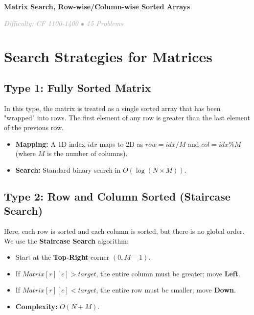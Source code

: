 \documentclass[11pt,a4paper,oneside]{book}
\begin{document}
\begin{tcolorbox}[
    enhanced,
    colback=white,
    colframe=secondaryblue,
    boxrule=1pt,
    arc=2mm,
    left=10pt,
    right=10pt
]
\textbf{\large\textcolor{primaryblue}{Matrix Search, Row-wise/Column-wise Sorted Arrays}}
\end{tcolorbox}

\vspace{0.5cm}

\begin{center}
\textit{\textcolor{darkgray}{Difficulty: CF 1100-1400 $\bullet$ 15 Problems}}
\end{center}

\section{Search Strategies for Matrices}

\subsection{Type 1: Fully Sorted Matrix}
In this type, the matrix is treated as a single sorted array that has been "wrapped" into rows. The first element of any row is greater than the last element of the previous row.
\begin{itemize}
    \item \textbf{Mapping:} A 1D index $idx$ maps to 2D as $row = idx / M$ and $col = idx \% M$ (where $M$ is the number of columns).
    \item \textbf{Search:} Standard binary search in $O(\log(N \times M))$.
\end{itemize}



\subsection{Type 2: Row and Column Sorted (Staircase Search)}
Here, each row is sorted and each column is sorted, but there is no global order. We use the \textbf{Staircase Search} algorithm:
\begin{itemize}
    \item Start at the \textbf{Top-Right} corner $(0, M-1)$.
    \item If $Matrix[r][c] > target$, the entire column must be greater; move \textbf{Left}.
    \item If $Matrix[r][c] < target$, the entire row must be smaller; move \textbf{Down}.
    \item \textbf{Complexity:} $O(N + M)$.
\end{itemize}
\end{document}
